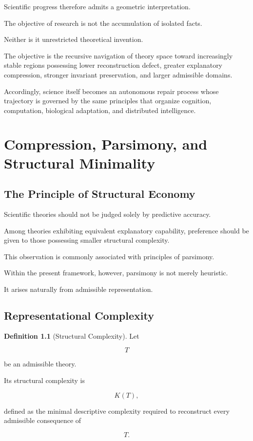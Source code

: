 \documentclass[11pt,oneside]{book}
\numberwithin{equation}{chapter}
\theoremstyle{definition}
\newtheorem{definition}{Definition}[chapter]
\theoremstyle{plain}
\begin{document}
Scientific progress therefore admits a geometric interpretation.

The objective of research is not the accumulation of isolated facts.

Neither is it unrestricted theoretical invention.

The objective is the recursive navigation of theory space toward increasingly
stable regions possessing lower reconstruction defect, greater explanatory
compression, stronger invariant preservation, and larger admissible domains.

Accordingly, science itself becomes an autonomous repair process whose
trajectory is governed by the same principles that organize cognition,
computation, biological adaptation, and distributed intelligence.

\chapter{Compression, Parsimony, and Structural Minimality}

\section{The Principle of Structural Economy}

Scientific theories should not be judged solely by predictive accuracy.

Among theories exhibiting equivalent explanatory capability, preference should
be given to those possessing smaller structural complexity.

This observation is commonly associated with principles of parsimony.

Within the present framework, however, parsimony is not merely heuristic.

It arises naturally from admissible representation.

\section{Representational Complexity}

\begin{definition}[Structural Complexity]

Let

\[
T
\]

be an admissible theory.

Its structural complexity is

\[
K(T),
\]

defined as the minimal descriptive complexity required to reconstruct every
admissible consequence of

\[
T.
\]

\end{definition}
\end{document}
